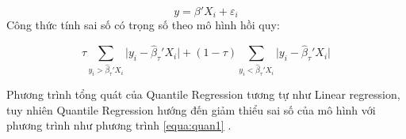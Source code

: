 \begin{equation}
y = \beta'X_i +\varepsilon_i
\end{equation}
Công thức tính sai số có trọng số theo mô hình hồi quy:\par
\begin{equation}
\tau \sum_{y_i>\hat{\beta}_{\tau}'X_i}\vert y_i- \hat{\beta}_\tau'X_i\vert + (1-\tau)\sum_{y_i<\hat{\beta}_{\tau}'X_i}\vert y_i- \hat{\beta}_\tau'X_i\vert
\label{equa:quan1}
\end{equation}

Phương trình tổng quát của Quantile Regression tương tự như Linear regression, tuy nhiên Quantile Regression hướng đến giảm thiểu sai số của mô hình với phương trình như phương trình \eqref{equa:quan1} .